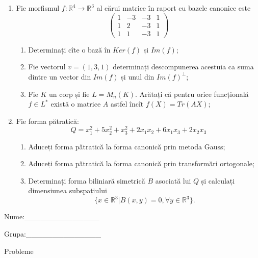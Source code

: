 \documentclass{article}
\begin{document}
\begin{enumerate}
 \item Fie morfismul $f:\mathbb{R}^4 \to \mathbb{R}^3$ al cărui matrice în raport cu bazele canonice este
$$\begin{pmatrix}
1&-3&-3&1\\
1&2&-3&1\\
1&1&-3&1
\end{pmatrix}$$

\begin{enumerate}
\item Determinați cîte o bază în $Ker(f)$ și $Im(f)$;
\item Fie vectorul $v=(1,3,1)$ determinați descompunerea acestuia ca suma dintre un vector din $Im(f)$ și unul din $Im(f)^\perp$;
\item Fie $K$ un corp și fie $L=M_n(K)$. Arătați că pentru orice funcțională $f \in L^*$ există o matrice $A$ astfel încît $f(X)=Tr(AX)$;
\end{enumerate}
\item Fie forma pătratică:
$$Q= x_1^2+5x_2^2+x_3^2+2x_1x_2+6x_1x_3+2x_2x_3$$

\begin{enumerate}
\item Aduceți forma pătratică la forma canonică prin metoda Gauss;
\item Aduceți forma pătratică la forma canonică prin transformări ortogonale;
\item Determinați forma biliniară simetrică $B$ asociată lui $Q$ și calculați dimensiunea subspațiului
$$\{x \in \mathbb{R}^3 | B(x,y)=0,\forall y \in \mathbb{R}^3\}.$$

\end{enumerate}
\end{enumerate}
\newpage
\begin{flushright}
Nume:\_\_\_\_\_\_\_\_\_\_\_\_\_\_
 
 
Grupa:\_\_\_\_\_\_\_\_\_\_\_\_\_\_
\end{flushright}
\begin{center}
\vspace{2cm}
{\Large Probleme}
\vspace{2cm}
\end{center}
\end{document}

